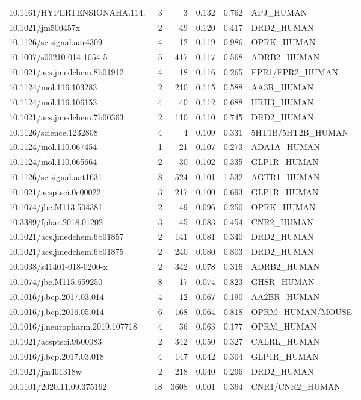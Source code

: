 \documentclass[11pt]{article}
\begin{document}
\begin{longtable}{p{5.9cm} r r c c p{4.1cm}}
10.1161/\allowbreak HYPERTENSIONAHA.114.\allowbreak 05099 & 3 & 3 & 0.132 & 0.762 & APJ\_\allowbreak{}HUMAN \\
10.1021/jm500457x & 2 & 49 & 0.120 & 0.417 & DRD2\_\allowbreak{}HUMAN \\
10.1126/scisignal.aar4309 & 4 & 12 & 0.119 & 0.986 & OPRK\_\allowbreak{}HUMAN \\
10.1007/s00210-014-1054-5 & 5 & 417 & 0.117 & 0.568 & ADRB2\_\allowbreak{}HUMAN \\
10.1021/acs.jmedchem.8b01912 & 4 & 18 & 0.116 & 0.265 & FPR1/FPR2\_\allowbreak{}HUMAN \\
10.1124/mol.116.103283 & 2 & 210 & 0.115 & 0.588 & AA3R\_\allowbreak{}HUMAN \\
10.1124/mol.116.106153 & 4 & 40 & 0.112 & 0.688 & HRH3\_\allowbreak{}HUMAN \\
10.1021/acs.jmedchem.7b00363 & 2 & 110 & 0.110 & 0.745 & DRD2\_\allowbreak{}HUMAN \\
10.1126/science.1232808 & 4 & 4 & 0.109 & 0.331 & 5HT1B/5HT2B\_\allowbreak{}HUMAN \\
10.1124/mol.110.067454 & 1 & 21 & 0.107 & 0.273 & ADA1A\_\allowbreak{}HUMAN \\
10.1124/mol.110.065664 & 2 & 30 & 0.102 & 0.335 & GLP1R\_\allowbreak{}HUMAN \\
10.1126/scisignal.aat1631 & 8 & 524 & 0.101 & 1.532 & AGTR1\_\allowbreak{}HUMAN \\
10.1021/acsptsci.0c00022 & 3 & 217 & 0.100 & 0.693 & GLP1R\_\allowbreak{}HUMAN \\
10.1074/jbc.M113.504381 & 2 & 49 & 0.096 & 0.250 & OPRK\_\allowbreak{}HUMAN \\
10.3389/fphar.2018.01202 & 3 & 45 & 0.083 & 0.454 & CNR2\_\allowbreak{}HUMAN \\
10.1021/acs.jmedchem.6b01857 & 2 & 141 & 0.081 & 0.340 & DRD2\_\allowbreak{}HUMAN \\
10.1021/acs.jmedchem.6b01875 & 2 & 240 & 0.080 & 0.803 & DRD2\_\allowbreak{}HUMAN \\
10.1038/s41401-018-0200-x & 2 & 342 & 0.078 & 0.316 & ADRB2\_\allowbreak{}HUMAN \\
10.1074/jbc.M115.659250 & 8 & 17 & 0.074 & 0.823 & GHSR\_\allowbreak{}HUMAN \\
10.1016/j.bcp.2017.03.014 & 4 & 12 & 0.067 & 0.190 & AA2BR\_\allowbreak{}HUMAN \\
10.1016/j.bcp.2016.05.014 & 6 & 168 & 0.064 & 0.818 & OPRM\_\allowbreak{}HUMAN/MOUSE \\
10.1016/j.neuropharm.2019.107718 & 4 & 36 & 0.063 & 0.177 & OPRM\_\allowbreak{}HUMAN \\
10.1021/acsptsci.9b00083 & 2 & 342 & 0.050 & 0.327 & CALRL\_\allowbreak{}HUMAN \\
10.1016/j.bcp.2017.03.018 & 4 & 147 & 0.042 & 0.304 & GLP1R\_\allowbreak{}HUMAN \\
10.1021/jm401318w & 2 & 218 & 0.040 & 0.296 & DRD2\_\allowbreak{}HUMAN \\
10.1101/2020.11.09.375162 & 18 & 3608 & 0.001 & 0.364 & CNR1/CNR2\_\allowbreak{}HUMAN \\
\end{longtable}
\end{document}
